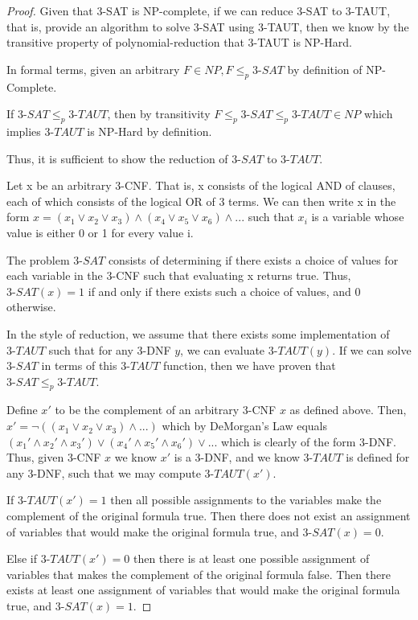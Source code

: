 \documentclass[11pt]{article}
\begin{document}
\begin{proof}

Given that 3-SAT is NP-complete, if we can reduce 3-SAT to 3-TAUT, that is, provide an algorithm to solve 3-SAT using 3-TAUT, then we know by the transitive property of polynomial-reduction that 3-TAUT is NP-Hard. 

In formal terms, given an arbitrary $F \in NP, F \leq_{p} 3\text{-}SAT$ by definition of NP-Complete. 

If $3\text{-}SAT \leq_{p} 3\text{-}TAUT$, then by transitivity $F \leq_{p} 3\text{-}SAT \leq_{p} 3\text{-}TAUT\in NP$ which implies $3\text{-}TAUT$ is NP-Hard by definition.

Thus, it is sufficient to show the reduction of $3\text{-}SAT$ to $3\text{-}TAUT$.

Let x be an arbitrary 3-CNF. That is, x consists of the logical AND of clauses, each of which consists of the logical OR of 3 terms. We can then write x in the form $x = (x_1 \lor x_2 \lor x_3) \land (x_4 \lor x_5 \lor x_6) \land ...$ such that $x_i$ is a variable whose value is either 0 or 1 for every value i.

The problem $3\text{-}SAT$ consists of determining if there exists a choice of values for each variable in the 3-CNF such that evaluating x returns true. Thus, $3\text{-}SAT(x) = 1$ if and only if there exists such a choice of values, and 0 otherwise.

In the style of reduction, we assume that there exists some implementation of $3\text{-}TAUT$ such that for any 3-DNF $y$, we can evaluate $3\text{-}TAUT(y)$. If we can solve $3\text{-}SAT$ in terms of this $3\text{-}TAUT$ function, then we have proven that $3\text{-}SAT \leq_{p} 3\text{-}TAUT$.

Define $x'$ to be the complement of an arbitrary 3-CNF $x$ as defined above. Then, $x' = \neg((x_1 \lor x_2 \lor x_3) \land ...)$ which by DeMorgan's Law equals $(x_1' \land x_2' \land x_3') \lor (x_4' \land x_5' \land x_6') \lor...$ which is clearly of the form 3-DNF. Thus, given 3-CNF $x$ we know $x'$ is a 3-DNF, and we know $3\text{-}TAUT$ is defined for any 3-DNF, such that we may compute $3\text{-}TAUT(x')$.

If $3\text{-}TAUT(x') = 1$ then all possible assignments to the variables make the complement of the original formula true. Then there does not exist an assignment of variables that would make the original formula true, and $3\text{-}SAT(x) = 0$.

Else if $3\text{-}TAUT(x') = 0$ then there is at least one possible assignment of variables that makes the complement of the original formula false. Then there exists at least one assignment of variables that would make the original formula true, and $3\text{-}SAT(x) = 1$.


\end{proof}
\end{document}

